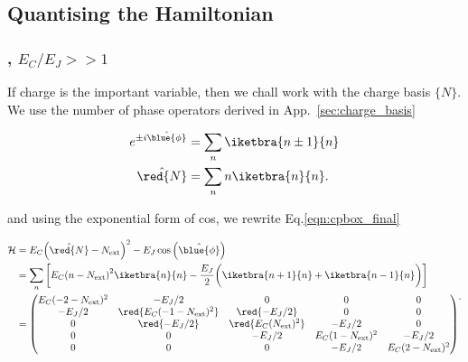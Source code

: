 \subsection{Quantising the Hamiltonian}
\subsubsection{, $ E_C/E_J >> 1$}
If charge is  the important variable, then we  chall work with the  charge basis $ \lbrace N  \rbrace $. We use the  number of phase
operators derived in App.~\ref{sec:charge_basis}

\begin{framed}\noindent

  \begin{equation}\label{key}
    \begin{aligned}
      e^{\pm i\hat{\blue{\phi}}} & = \sum_{n}\iketbra{n\pm 1}{n}\\
      \hat{\red{N}} & = \sum_{n}n\iketbra{n}{n}.
    \end{aligned}
  \end{equation}

\end{framed}

\noindent and using the exponential form of cos, we rewrite Eq.\eqref{eqn:cpbox_final}

\begin{equation}
  \begin{aligned}
    \mathcal{H} & = E_C{\left(\hat{\red{N}}-N_\text{ext}\right)^2}- E_J\cos\left(\hat{\blue{\phi}}\right)\\
    & = \sum_n\bigg[E_C{\left(n-N_\text{ext}\right)^2}\iketbra{n}{n}- \frac{E_J}{2}\bigg(\iketbra{n+1}{n}+\iketbra{n-1}{n}\bigg)\bigg]\\
    & = \begin{pmatrix}
      E_C(-2-N_\text{ext})^2 & -E_J/2 & 0 & 0 & 0\\
      -E_J/2 & \red{E_C(-1-N_\text{ext})^2} & \red{-E_J/2} & 0 & 0\\
      0 & \red{-E_J/2} & \red{E_C(N_\text{ext})^2} & -E_J/2 & 0\\
      0 & 0 & -E_J/2 & E_C(1-N_\text{ext})^2 & -E_J/2\\
      0 & 0& 0 & -E_J/2 & E_C(2-N_\text{ext})^2\\
    \end{pmatrix}
  \end{aligned}.
  \label{l2-subbed2}
\end{equation}

